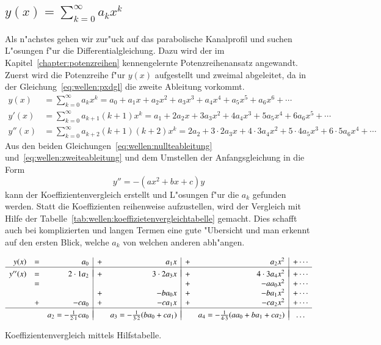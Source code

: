 \subsection{\texorpdfstring{$y(x) = \sum_{k = 0}^{\infty} a_{k}x^k$}{y(x) = 
summe k = 0 bis unendlich ak xk}}
\label{subsec:wellen:Potenzreihenansatz}

Als n"achstes gehen wir zur"uck auf das parabolische Kanalprofil und suchen 
L"osungen f"ur die Differentialgleichung. Dazu wird der im 
Kapitel~\ref{chapter:potenzreihen} kennengelernte Potenzreihenansatz angewandt.
Zuerst wird die Potenzreihe f"ur $y(x)$ aufgestellt und zweimal abgeleitet, da 
in der Gleichung~\eqref{eq:wellen:pxdgl} die zweite Ableitung vorkommt.
\begin{align}
	y(x)
	&=
	\sum_{k = 0}^{\infty} a_{k}x^k
	=
	a_0 + a_1x + a_2x^2 + a_3x^3 + a_4x^4 + a_5x^5 + a_6x^6 + \dotsb
	\label{eq:wellen:nullteableitung}
	\\
	y'(x)
	&=
	\sum_{k=0}^{\infty} a_{k+1}(k+1)x^k
	=
	a_1 + 2a_2x + 3a_3x^2 + 4a_4x^3 + 5a_5x^4 + 6a_6x^5+ \dotsb
	\\
	y''(x)
	&=
	\sum_{k = 0}^{\infty} a_{k+2}(k+1)(k+2)x^k
	=
	2a_2 + 3 \mathbin{\cdot} 2a_3x + 4 \mathbin{\cdot} 3a_4x^2 + 5 
	\mathbin{\cdot} 4a_5x^3 + 6 \mathbin{\cdot} 5a_6x^4 + \dotsb
	\label{eq:wellen:zweiteableitung}
\end{align}
Aus den beiden Gleichungen~\eqref{eq:wellen:nullteableitung} 
und~\eqref{eq:wellen:zweiteableitung} und dem Umstellen der Anfangsgleichung in 
die Form
\begin{equation*}
	y'' = -(ax^2+bx+c)y
\end{equation*}
kann der Koeffizientenvergleich erstellt und L"osungen f"ur die $a_k$ gefunden 
werden. Statt die Koeffizienten reihenweise aufzustellen, wird der Vergleich 
mit Hilfe der Tabelle~\ref{tab:wellen:koeffizietenvergleichtabelle} gemacht. 
Dies schafft auch bei komplizierten und langen Termen eine gute "Ubersicht und 
man erkennt auf den ersten Blick, welche $a_k$ von welchen anderen abh"angen.
\begin{table}
	\centering
	\begin{equation*}
		\begin{array}{r c r | c r | c r | c r c}
		y(x) & = &
		a_0 & + & a_1x & + & a_2x^2 & + \dotsb
		\\
		\hline&&&&&&&\\[-2ex]
		y''(x) & = &
		2\cdot1 a_2 & + & 3\cdot2 a_3x & + & 4\cdot3 a_4x^2 & + \dotsb
		\\
		& = &
		& & & + &- aa_0x^2 & + \dotsb
		\\
		& &
		& + &- ba_0x & + &- ba_1x^2 & + \dotsb
		\\
		& + &
		-ca_0 & + &- ca_1x & + &- ca_2x^2 & + \dotsb
		\\
		\hline&&&&&&&\\[-2ex]
		& &
		a_2 = -\frac{1}{2 \cdot 1}ca_0
		& & a_3 = -\frac{1}{3 \cdot 2}(ba_0+ca_1)
		& & a_4 = -\frac{1}{4 \cdot 3}(aa_0+ba_1+ca_2)
		& \dots
		\end{array}
	\end{equation*}
	\caption{Koeffizientenvergleich mittels Hilfstabelle.}
	\label{tab:wellen:koeffizietenvergleichtabelle}
\end{table}


